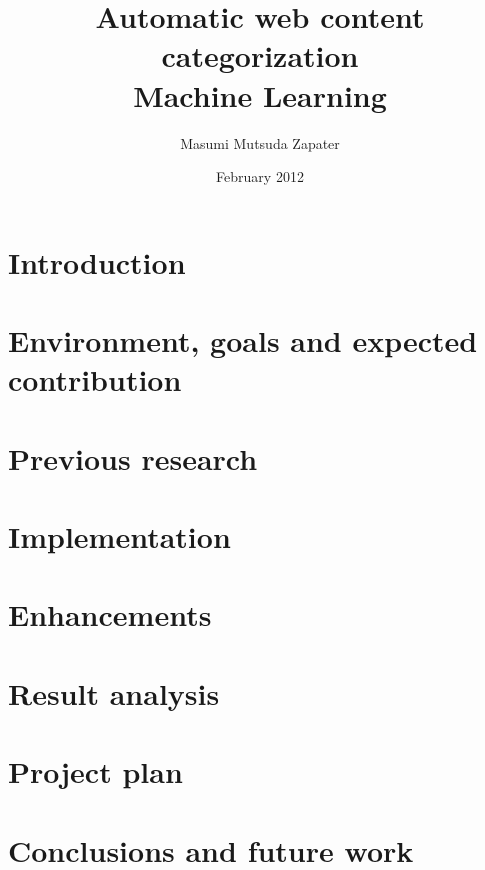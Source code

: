 \documentclass[12pt, a4paper , titlepage]{report}
\author{Masumi Mutsuda Zapater}
\title{Automatic web content categorization \\ Machine Learning}
\date{February 2012}
\begin{document}
\maketitle



\tableofcontents


\chapter{Introduction}


\chapter[Env. goals and contrib.]{Environment, goals and expected contribution}
\label{chap:flowsight}


\chapter{Previous research}
\label{chap:research}


\chapter{Implementation}
\label{chap:implementation}


\chapter{Enhancements}
\label{chap:enhancements}


\chapter{Result analysis}
\label{chap:results}


\chapter{Project plan}
\label{chap:plan}



\chapter[Conclusions]{Conclusions and future work}
\label{chap:conclusions}



\end{document}
